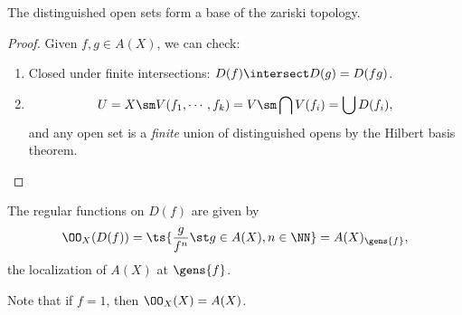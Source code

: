 \begin{proposition}

The distinguished open sets form a base of the zariski topology.

\end{proposition}

\begin{proof}

Given \(f, g\in A(X)\), we can check:

\begin{enumerate}
\def\labelenumi{\arabic{enumi}.}
\tightlist
\item
  Closed under finite intersections: \(D(f) \intersect D(g) = D(fg)\).
\item

  \begin{align*}U = X\sm V(f_1, \cdots, f_k) = V\sm \bigcap V(f_i) = \bigcup D(f_i),\end{align*}
  and any open set is a \emph{finite} union of distinguished opens by
  the Hilbert basis theorem.
\end{enumerate}

\end{proof}

\begin{proposition}[?]

The regular functions on \(D(f)\) are given by
\begin{align*}  
\OO_X(D(f)) = \ts{{ g \over f^n} \st g\in A(X), n\in \NN} = A(X)_{\gens{f}}
,\end{align*} the localization of \(A(X)\) at \(\gens{f}\).

\end{proposition}

Note that if \(f=1\), then \(\OO_X(X) = A(X)\).

